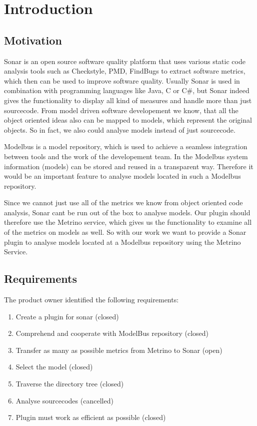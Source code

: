 \chapter{Introduction}
\section{Motivation}
Sonar is an open source software quality platform that uses various static code analysis tools such as Checkstyle, PMD, FindBugs to extract software metrics, which then can be used to improve software quality. Usually Sonar is used in combination with programming languages like Java, C or C\#, but Sonar indeed gives the functionality to display all kind of measures and handle more than just sourcecode. From model driven software developement we know, that all the object oriented ideas also can be mapped to models, which represent the original objects. So in fact, we also could analyse models instead of just sourcecode.

Modelbus is a model repository, which is used to achieve a seamless integration between tools and the work of the developement team. In the Modelbus system information (models) can be stored and reused in a transparent way. Therefore it would be an important feature to analyse models located in such a Modelbus repository.

Since we cannot just use all of the metrics we know from object oriented code analysis, Sonar cant be run out of the box to analyse models. Our plugin should therefore use the Metrino service, which gives us the functionality to examine all of the metrics on models as well. So with our work we want to provide a Sonar plugin to analyse models located at a Modelbus repository using the Metrino Service.

\section{Requirements}
The product owner identified the following requirements:
\begin{enumerate}
\item Create a plugin for sonar (closed)
\item Comprehend and cooperate with ModelBus repository (closed)
\item Transfer as many as possible metrics from Metrino to Sonar (open)
\item Select the model (closed)
\item Traverse the directory tree (closed)
\item Analyse sourcecodes (cancelled)
\item Plugin must work as efficient as possible (closed)
\end{enumerate}

